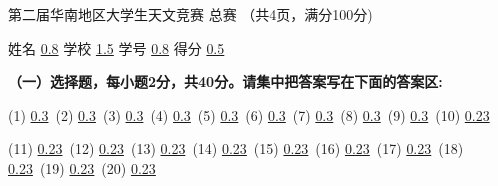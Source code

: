 \documentclass[CJK]{article}
\begin{document}
\bch
\bcenter
第二届华南地区大学生天文竞赛 总赛 （共4页，满分100分) 

{\vskip 0.05in}

姓名 \uline{0.8} {\hskip 0.2in}  学校 \uline{1.5}{\hskip 0.2in} 学号 \uline{0.8}{\hskip 0.2in} 得分 \uline{0.5}

\ecenter

{\bf \noindent（一）选择题，每小题2分，共40分。请集中把答案写在下面的答案区:}

{\vskip 0.04in}

{(1) \uline{0.3}\ (2) \uline{0.3}\ (3) \uline{0.3}\ (4) \uline{0.3}\ (5) \uline{0.3}\ (6) \uline{0.3}\ (7) \uline{0.3}\ (8) \uline{0.3}\ (9) \uline{0.3}\ (10) \uline{0.23}}

{\vskip 0.04in}

{(11) \uline{0.23}\  (12) \uline{0.23}\ (13) \uline{0.23}\ (14) \uline{0.23}\ (15) \uline{0.23}\ (16) \uline{0.23}\ (17) \uline{0.23}\ (18) \uline{0.23}\ (19) \uline{0.23}\ (20) \uline{0.23}}
\end{document}
